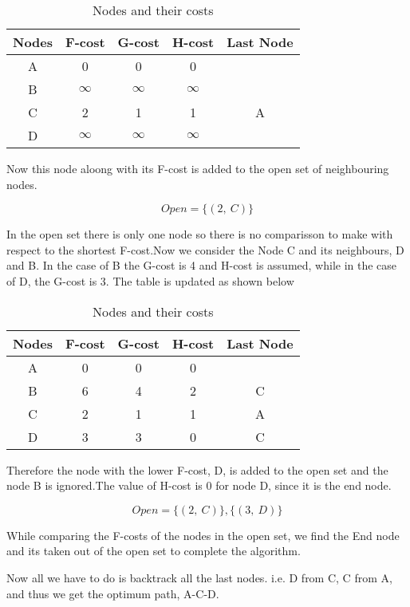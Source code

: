 \begin{table}
\centering
    \begin{tabular}{ |c|c|c|c|c| } 
    \hline
    Nodes & F-cost & G-cost & H-cost & Last Node \\
    \hline 
    A & 0 & 0 & 0 &\\ 
    B & $\infty$ & $\infty$ & $\infty$ &\\ 
    C & 2 & 1 & 1 & A\\ 
    D & $\infty$ & $\infty$ & $\infty$ &\\
    \hline
    \end{tabular}
    \caption{Nodes and their costs}
    \label{table:nodeCost1}
\end{table}

Now this node aloong with its F-cost is added to the open set of neighbouring nodes.

\[Open = \{(2, \ C)\}\]

In the open set there is only one node so there is no comparisson to make with respect to the shortest F-cost.Now we consider the Node C and its neighbours, D and B. In the case of B the G-cost is 4 and H-cost is assumed, while in the case of D, the G-cost is 3. 
    The table is updated as shown below

\begin{table}
\centering
    \begin{tabular}{ |c|c|c|c|c| } 
    \hline
    Nodes & F-cost & G-cost & H-cost & Last Node \\
    \hline     
    A & 0 & 0 & 0 &\\ 
    B & 6 & 4 & 2 & C\\ 
    C & 2 & 1 & 1 & A\\ 
    D & 3 & 3 & 0 & C\\
    \hline
    \end{tabular}
    \caption{Nodes and their costs}
    \label{table:nodeCost2}
\end{table}

Therefore the node with the lower F-cost, D, is added to the open set and the node B is ignored.The value of H-cost is 0 for node D, since it is the end node.

\[Open = \{(2, \ C)\}, \{(3, \ D)\}\]

While comparing the F-costs of the nodes in the open set, we find the End node and its taken out of the open set to complete the algorithm.

Now all we have to do is backtrack all the last nodes. i.e. D from C, C from A, and thus we get the optimum path, A-C-D.


